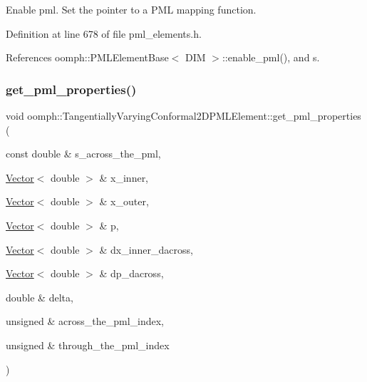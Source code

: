 Enable pml. Set the pointer to a P\+ML mapping function. 



Definition at line 678 of file pml\+\_\+elements.\+h.



References oomph\+::\+P\+M\+L\+Element\+Base$<$ D\+I\+M $>$\+::enable\+\_\+pml(), and s.

\mbox{\label{classoomph_1_1TangentiallyVaryingConformal2DPMLElement_a68cdd899d050ccd22720b928d9fa901a}} 
\subsubsection{\texorpdfstring{get\+\_\+pml\+\_\+properties()}{get\_pml\_properties()}}
{\footnotesize\ttfamily void oomph\+::\+Tangentially\+Varying\+Conformal2\+D\+P\+M\+L\+Element\+::get\+\_\+pml\+\_\+properties (\begin{DoxyParamCaption}\item[{const double \&}]{s\+\_\+across\+\_\+the\+\_\+pml,  }\item[{\hyperlink{classoomph_1_1Vector}{Vector}$<$ double $>$ \&}]{x\+\_\+inner,  }\item[{\hyperlink{classoomph_1_1Vector}{Vector}$<$ double $>$ \&}]{x\+\_\+outer,  }\item[{\hyperlink{classoomph_1_1Vector}{Vector}$<$ double $>$ \&}]{p,  }\item[{\hyperlink{classoomph_1_1Vector}{Vector}$<$ double $>$ \&}]{dx\+\_\+inner\+\_\+dacross,  }\item[{\hyperlink{classoomph_1_1Vector}{Vector}$<$ double $>$ \&}]{dp\+\_\+dacross,  }\item[{double \&}]{delta,  }\item[{unsigned \&}]{across\+\_\+the\+\_\+pml\+\_\+index,  }\item[{unsigned \&}]{through\+\_\+the\+\_\+pml\+\_\+index }\end{DoxyParamCaption})\hspace{0.3cm}{\ttfamily [protected]}}

